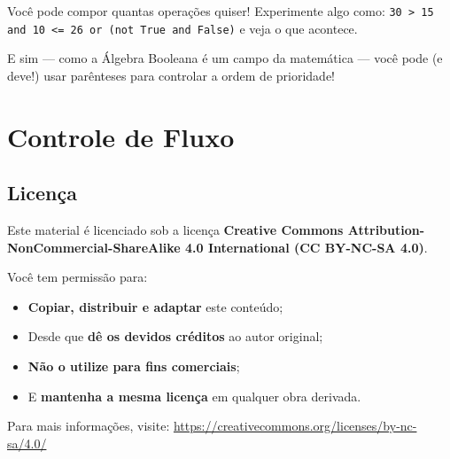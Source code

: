 \documentclass[12pt]{book}
\begin{document}
	\begin{tcolorbox}[colback=gray!10, colframe=black, title={\large\bfseries Dica}]
		Você pode compor quantas operações quiser! Experimente algo como: \texttt{30 > 15 and 10 <= 26 or (not True and False)} e veja o que acontece. \newline
		
		E sim — como a Álgebra Booleana é um campo da matemática — você pode (e deve!) usar parênteses para controlar a ordem de prioridade!
	\end{tcolorbox}
	
	\chapter{Controle de Fluxo}
	
	
	\newpage
	\section*{Licença \faCreativeCommons}
	
	Este material é licenciado sob a licença \textbf{Creative Commons Attribution-NonCommercial-ShareAlike 4.0 International (CC BY-NC-SA 4.0)}.
	
	\vspace{1em}
	
	Você tem permissão para:
	
	\begin{itemize}
		\item \textbf{Copiar, distribuir e adaptar} este conteúdo;
		\item Desde que \textbf{dê os devidos créditos} ao autor original;
		\item \textbf{Não o utilize para fins comerciais};
		\item E \textbf{mantenha a mesma licença} em qualquer obra derivada.
	\end{itemize}
	
	\vspace{1em}
	
	Para mais informações, visite:  
	\href{https://creativecommons.org/licenses/by-nc-sa/4.0/}{https://creativecommons.org/licenses/by-nc-sa/4.0/}
	
	\vfill
	
	\begin{center}
		\faCreativeCommons\quad
		\faCreativeCommonsBy\quad
		\faCreativeCommonsNc\quad
		\faCreativeCommonsSa
	\end{center}
	
\end{document}
